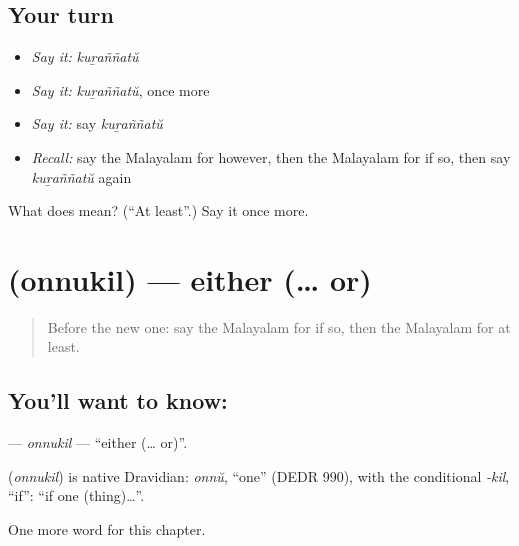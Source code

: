 \subsection*{Your turn}
\begin{itemize}
\raggedright
  \item \emph{Say it:} \emph{kuṟaññatŭ}
  \item \emph{Say it:} \emph{kuṟaññatŭ}, once more
  \item \emph{Say it:} say \emph{kuṟaññatŭ}
  \item \emph{Recall:} say the Malayalam for however, then the Malayalam for if so, then say \emph{kuṟaññatŭ} again
\end{itemize}

\begin{tcolorbox}[breakable,colback=teal!4,colframe=teal!35!black,title={Before you move on}]
What does  mean? (\textquotedblleft{}At least\textquotedblright{}.) Say it once more.
\end{tcolorbox}
\section[\texorpdfstring{\ml{ഒന്നുകിൽ} (onnukil)}{ഒന്നുകിൽ (onnukil)}]{ (onnukil) — either (… or)}

\label{lesson:ML-C242-onnukil}



\begin{quote}
Before the new one: say the Malayalam for if so, then the Malayalam for at least.
\end{quote}

\subsection*{You'll want to know: }
\textbf{} — \emph{onnukil} — \textquotedblleft{}either (… or)\textquotedblright{}.

\begin{cousinweb}
\textbf{} (\emph{onnukil}) is native Dravidian: \emph{onnŭ}, \textquotedblleft{}one\textquotedblright{} (DEDR 990), with the conditional \emph{-kil}, \textquotedblleft{}if\textquotedblright{}: \textquotedblleft{}if one (thing)…\textquotedblright{}.
\end{cousinweb}

\begin{grammarlens}[title={What you've built}]
One more word for this chapter.
\end{grammarlens}


